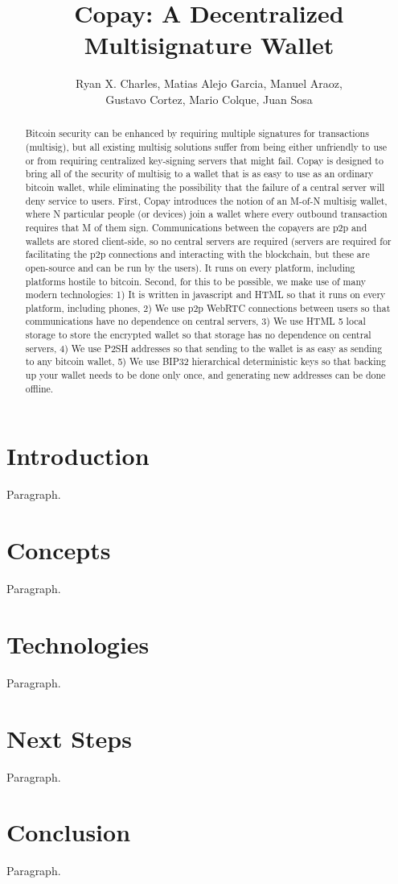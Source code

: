 \documentclass{article}
\begin{document}
\pagestyle{headings}
\title{Copay: A Decentralized Multisignature Wallet}
\author{
Ryan X. Charles,
Matias Alejo Garcia,
Manuel Araoz,\\
Gustavo Cortez,
Mario Colque,
Juan Sosa
}
\date{}
\maketitle
\begin{abstract}
Bitcoin security can be enhanced by requiring multiple signatures for transactions (multisig), but all existing multisig solutions suffer from being either unfriendly to use or from requiring centralized key-signing servers that might fail.
Copay is designed to bring all of the security of multisig to a wallet that is as easy to use as an ordinary bitcoin wallet, while eliminating the possibility that the failure of a central server will deny service to users.
First, Copay introduces the notion of an M-of-N multisig wallet, where N particular people (or devices) join a wallet where every outbound transaction requires that M of them sign.
Communications between the copayers are p2p and wallets are stored client-side, so no central servers are required (servers are required for facilitating the p2p connections and interacting with the blockchain, but these are open-source and can be run by the users).
It runs on every platform, including platforms hostile to bitcoin.
Second, for this to be possible, we make use of many modern technologies:
1) It is written in javascript and HTML so that it runs on every platform, including phones,
2) We use p2p WebRTC connections between users so that communications have no dependence on central servers,
3) We use HTML 5 local storage to store the encrypted wallet so that storage has no dependence on central servers,
4) We use P2SH addresses so that sending to the wallet is as easy as sending to any bitcoin wallet,
5) We use BIP32 hierarchical deterministic keys so that backing up your wallet needs to be done only once, and generating new addresses can be done offline.
\end{abstract}

\section{Introduction}

Paragraph.

\section{Concepts}

Paragraph.

\section{Technologies}

Paragraph.

\section{Next Steps}

Paragraph.

\section{Conclusion}

Paragraph.
\end{document}
